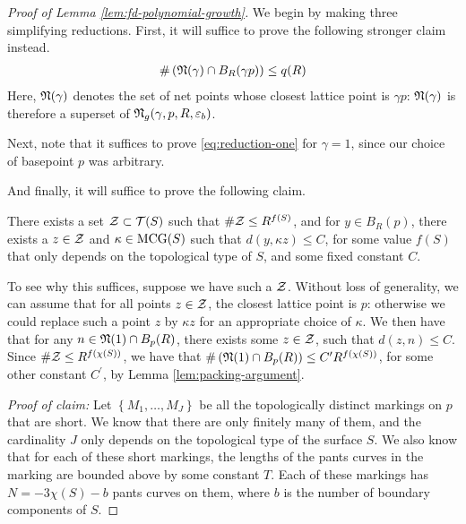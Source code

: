 \begin{proof}[Proof of Lemma \ref{lem:fd-polynomial-growth}]
  We begin by making three simplifying reductions.
  First, it will suffice to prove the following stronger claim instead.
  \begin{align}
    \label{eq:reduction-one}
    \#\left( \mathfrak{N}(\gamma) \cap B_R(\gamma p) \right) \leq q(R)
  \end{align}
  Here, $\mathfrak{N}(\gamma)$ denotes the set of net points whose closest lattice point is $\gamma p$: $\mathfrak{N}(\gamma)$ is therefore a superset of $\mathfrak{N}_g(\gamma, p, R, \varepsilon_b)$.

  Next, note that it suffices to prove \eqref{eq:reduction-one} for $\gamma = 1$, since our choice of basepoint $p$ was arbitrary.

  And finally, it will suffice to prove the following claim.
  \begin{claim*}
  There exists a set $\mathcal{Z} \subset \mathcal{T}(S)$ such that $\# \mathcal{Z} \leq R^{f(S)}$, and for $y \in B_R(p)$, there exists a $z \in \mathcal{Z}$ and $\kappa \in \mathrm{MCG}(S)$ such that $d(y, \kappa z) \leq C$, for some value $f(S)$ that only depends on the topological type of $S$, and some fixed constant $C$.
  \end{claim*}
  To see why this suffices, suppose we have such a $\mathcal{Z}$.
  Without loss of generality, we can assume that for all points $z \in \mathcal{Z}$, the closest lattice point is $p$: otherwise we could replace such a point $z$ by $\kappa z$ for an appropriate choice of $\kappa$.
We then have that for any $n \in \mathfrak{N}(1) \cap B_p(R)$, there exists some $z \in \mathcal{Z}$, such that $d(z, n) \leq C$.
Since $\# \mathcal{Z} \leq R^{f(\chi(S))}$, we have that $\#\left( \mathfrak{N}(1) \cap B_p(R) \right) \leq C^{\prime} R^{f(\chi(S))}$, for some other constant $C^{\prime}$, by Lemma \ref{lem:packing-argument}.

\emph{Proof of claim:}
  Let $\left\{ M_1, \ldots, M_J \right\}$ be all the topologically distinct markings on $p$ that are short.
  We know that there are only finitely many of them, and the cardinality $J$ only depends on the topological type of the surface $S$.
  We also know that for each of these short markings, the lengths of the pants curves in the marking are bounded above by some constant $T$.
  Each of these markings has $N = -3 \chi(S) - b$ pants curves on them, where $b$ is the number of boundary components of $S$.


\end{proof}
